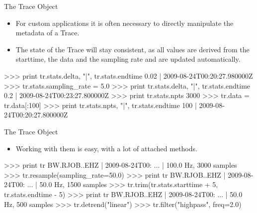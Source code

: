\documentclass[handout]{beamer}
\begin{document}
\begin{frame}{The Trace Object}
 \begin{itemize}
     \item For custom applications it is often necessary to directly manipulate
         the metadata of a Trace.
     \item The state of the Trace will stay consistent, as all values are
         derived from the starttime, the data and the sampling rate and are
         updated automatically.
 \end{itemize}

\begin{myColorBox}{0.95}{}
\begin{python}
>>> print tr.stats.delta, "|", tr.stats.endtime
0.02 | 2009-08-24T00:20:27.980000Z
>>> tr.stats.sampling_rate = 5.0
>>> print tr.stats.delta, "|", tr.stats.endtime
0.2 | 2009-08-24T00:23:27.800000Z
>>> print tr.stats.npts
3000
>>> tr.data = tr.data[:100]
>>> print tr.stats.npts, "|", tr.stats.endtime
100 | 2009-08-24T00:20:27.800000Z

\end{python}
\end{myColorBox}

\end{frame}

\begin{frame}{The Trace Object}
 \begin{itemize}
     \item Working with them is easy, with a lot of attached methods.
 \end{itemize}

\begin{myColorBox}{0.95}{}
\begin{python}
>>> print tr
BW.RJOB..EHZ | 2009-08-24T00: ... | 100.0 Hz, 3000 samples
>>> tr.resample(sampling_rate=50.0)
>>> print tr
BW.RJOB..EHZ | 2009-08-24T00: ... | 50.0 Hz, 1500 samples
>>> tr.trim(tr.stats.starttime + 5, tr.stats.endtime - 5)
>>> print tr
BW.RJOB..EHZ | 2009-08-24T00: ... | 50.0 Hz, 500 samples
>>> tr.detrend("linear")
>>> tr.filter("highpass", freq=2.0)

\end{python}
\end{myColorBox}

\end{frame}
\end{document}

